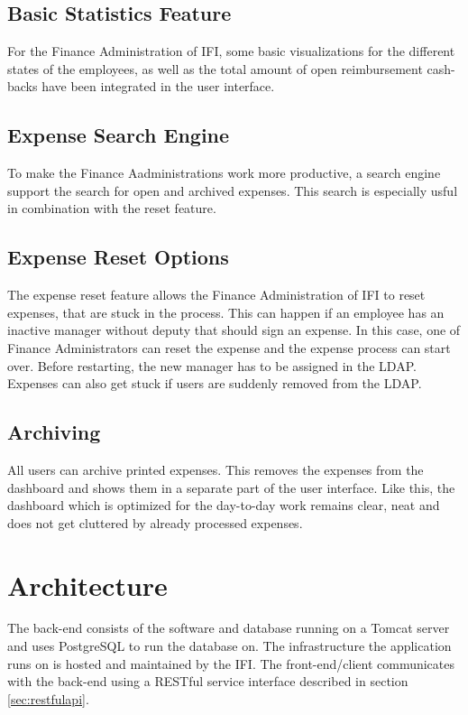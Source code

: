 \subsection{Basic Statistics Feature}
For the Finance Administration of IFI, some basic visualizations for the different states of the employees, as well as the total amount of open reimbursement cash-backs have been integrated in the user interface.

\subsection{Expense Search Engine}
To make the Finance Aadministrations work more productive, a search engine support the search for open and archived expenses. This search is especially usful in combination with the reset feature.

\subsection{Expense Reset Options}
The expense reset feature allows the Finance Administration of IFI to reset expenses, that are stuck in the process. This can happen if an employee has an inactive manager without deputy that should sign an expense. In this case, one of Finance Administrators can reset the expense and the expense process can start over. Before restarting, the new manager has to be assigned in the LDAP. Expenses can also get stuck if users are suddenly removed from the LDAP.

\subsection{Archiving}
All users can archive printed expenses. This removes the expenses from the dashboard and shows them in a separate part of the user interface. Like this, the dashboard which is optimized for the day-to-day work remains clear, neat and does not get cluttered by already processed expenses.

\section{Architecture}

The back-end consists of the software and database running on a Tomcat \cite{tomcat} server and uses PostgreSQL \cite{postgresql} to run the database on. The infrastructure the application runs on is hosted and maintained by the IFI. The front-end/client communicates with the back-end using a RESTful service interface described in section \ref{sec:restfulapi}.

